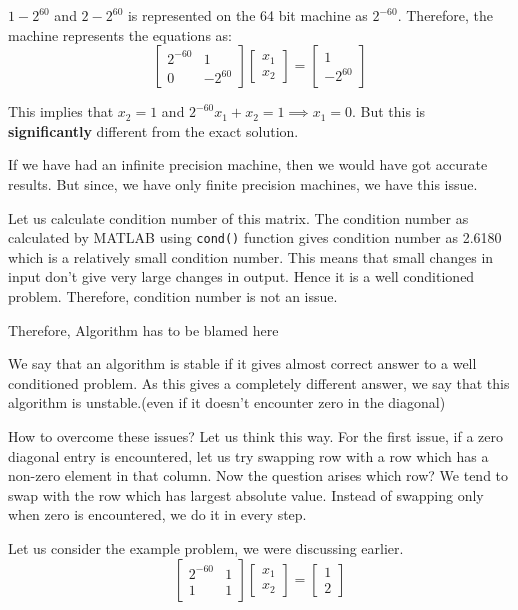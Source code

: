 \documentclass[
]{book}
\begin{document}
\(1-2^{60}\) and \(2-2^{60}\) is represented on the 64 bit machine as \(2^{-60}\). Therefore, the machine represents the equations as:
\begin{equation}
\begin{bmatrix}
2^{-60}& 1\\
0& -2^{60}
\end{bmatrix}
\begin{bmatrix}
x_1\\x_2
\end{bmatrix}
= 
\begin{bmatrix}
1\\-2^{60}
\end{bmatrix}
\end{equation}

This implies that \(x_2=1\) and \(2^{-60}x_1+x_2=1\implies x_1=0\). But this is \textbf{significantly} different from the exact solution.

If we have had an infinite precision machine, then we would have got accurate results. But since, we have only finite precision machines, we have this issue.

Let us calculate condition number of this matrix. The condition number as calculated by MATLAB using \texttt{cond()} function gives condition number as 2.6180 which is a relatively small condition number. This means that small changes in input don't give very large changes in output. Hence it is a well conditioned problem. Therefore, condition number is not an issue.

Therefore, Algorithm has to be blamed here

We say that an algorithm is stable if it gives almost correct answer to a well conditioned problem. As this gives a completely different answer, we say that this algorithm is unstable.(even if it doesn't encounter zero in the diagonal)

How to overcome these issues? Let us think this way. For the first issue, if a zero diagonal entry is encountered, let us try swapping row with a row which has a non-zero element in that column. Now the question arises which row? We tend to swap with the row which has largest absolute value. Instead of swapping only when zero is encountered, we do it in every step.

Let us consider the example problem, we were discussing earlier.
\begin{equation}
\begin{bmatrix}
2^{-60}& 1\\
1& 1
\end{bmatrix}
\begin{bmatrix}
x_1\\x_2
\end{bmatrix}
= 
\begin{bmatrix}
1\\2
\end{bmatrix}
\end{equation}
\end{document}
